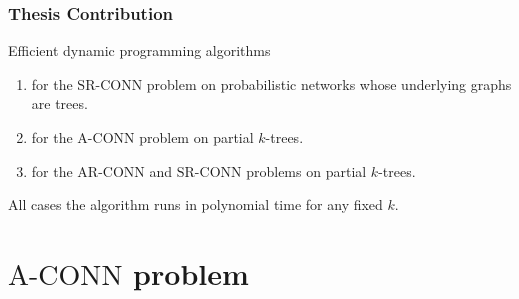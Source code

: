 \documentclass{beamer}
\newcommand{\ACONN}   { {\mathrm {A\mbox{-}CONN}} }
\newcommand{\ARCONN}   { {\mathrm {AR\mbox{-}CONN}} }
\newcommand{\SRCONN}   { {\mathrm {SR\mbox{-}CONN}} }
\begin{document}
%
%
%
\begin{frame}
\frametitle{Thesis Contribution}
Efficient dynamic programming algorithms
\begin{enumerate}
\item for the $\SRCONN$ problem on probabilistic networks whose underlying graphs are trees.%
\item for the $\ACONN$ problem on partial $k$-trees.
\item for the $\ARCONN$ and $\SRCONN$ problems on partial $k$-trees.
\end{enumerate}
All cases the algorithm runs in polynomial time for any fixed $k$. 
\end{frame}
\section{$\ACONN$ problem}
\end{document}
